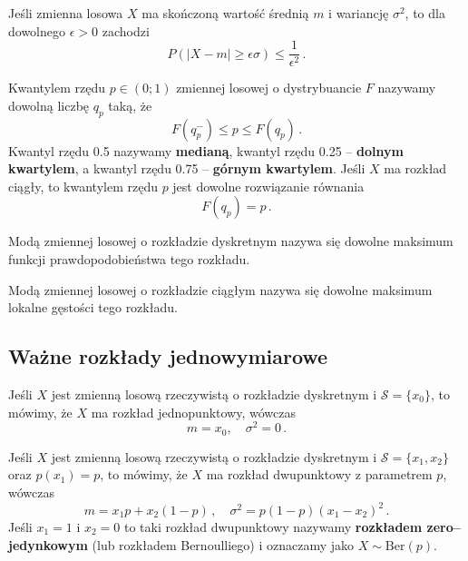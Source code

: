 \documentclass{myclass}
\numberwithin{equation}{section}
\begin{document}
\begin{theorem}
Jeśli zmienna losowa \(X\) ma skończoną wartość średnią \(m\) i wariancję \(\sigma^2\), to dla
dowolnego \(\epsilon > 0\) zachodzi
\begin{equation*}
    P(|X - m| \geq \epsilon\sigma) \leq \frac{1}{\epsilon^2}\,.
\end{equation*}
\end{theorem}

\begin{definition}[Kwantyla]
Kwantylem rzędu \(p \in (0;1)\) zmiennej losowej o dystrybuancie \(F\) nazywamy dowolną liczbę
\(q_p\) taką, że
\begin{equation*}
    F(q_p^-) \leq p \leq F(q_p)\,.
\end{equation*}
Kwantyl rzędu 0.5 nazywamy \textbf{medianą}, kwantyl rzędu 0.25 -- \textbf{dolnym kwartylem},
a kwantyl rzędu 0.75 -- \textbf{górnym kwartylem}. Jeśli \(X\) ma rozkład ciągły, to kwantylem
rzędu \(p\) jest dowolne rozwiązanie równania
\begin{equation*}
    F(q_p) = p\,.
\end{equation*}
\end{definition}

\begin{definition}[Mody]
Modą zmiennej losowej o rozkładzie dyskretnym nazywa się dowolne maksimum funkcji prawdopodobieństwa
tego rozkładu.

Modą zmiennej losowej o rozkładzie ciągłym nazywa się dowolne maksimum lokalne gęstości tego
rozkładu.
\end{definition}


\subsection{Ważne rozkłady jednowymiarowe}

\begin{definition}
Jeśli \(X\) jest zmienną losową rzeczywistą o rozkładzie dyskretnym i \(\mathcal{S} = \{x_0\}\), to
mówimy, że \(X\) ma rozkład jednopunktowy, wówczas
\begin{equation*}
    m = x_0,\quad \sigma^2 = 0\,.
\end{equation*}
\end{definition}

\begin{definition}
Jeśli \(X\) jest zmienną losową rzeczywistą o rozkładzie dyskretnym i \(\mathcal{S} = \{x_1, x_2\}\)
oraz \(p(x_1) = p\), to mówimy, że \(X\) ma rozkład dwupunktowy z parametrem \(p\), wówczas
\begin{equation*}
    m = x_1 p + x_2 (1 - p)\,,\quad \sigma^2 = p (1 - p) (x_1 - x_2)^2\,.
\end{equation*}
Jeśli \(x_1 = 1\) i \(x_2 = 0\) to taki rozkład dwupunktowy nazywamy \textbf{rozkładem
zero--jedynkowym} (lub rozkładem Bernoulliego) i oznaczamy jako \(X \sim \mathrm{Ber}(p)\).
\end{definition}
\end{document}
